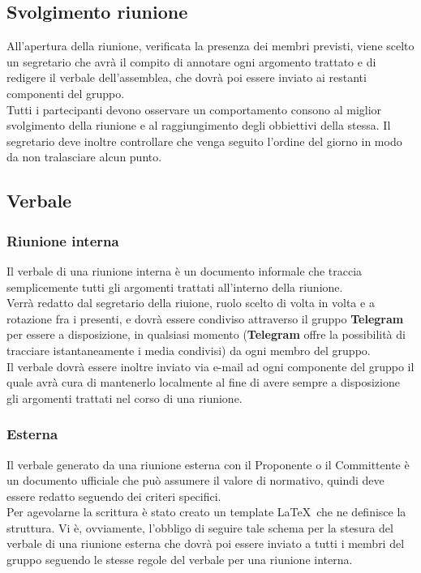     \subsection{Svolgimento riunione}
      All’apertura della riunione, verificata la presenza dei membri previsti, viene scelto un segretario che avrà il compito di annotare ogni argomento trattato e di redigere il verbale
      dell’assemblea, che dovrà poi essere inviato ai restanti componenti del gruppo.\\
      Tutti i partecipanti devono osservare un comportamento consono al miglior svolgimento della riunione e al raggiungimento degli obbiettivi della stessa. Il segretario deve inoltre
      controllare che venga seguito l’ordine del giorno in modo da non tralasciare alcun punto.
    \subsection{Verbale}
      \subsubsection{Riunione interna}
        Il verbale di una riunione interna è un documento informale che traccia semplicemente tutti gli argomenti trattati all'interno della riunione.\\
        Verrà redatto dal segretario della riuione, ruolo scelto di volta in volta e a rotazione fra i presenti, e dovrà essere condiviso attraverso il gruppo \textbf{Telegram}
        per essere a disposizione, in qualsiasi momento (\textbf{Telegram} offre la possibilità di tracciare istantaneamente i media condivisi) da ogni membro del gruppo.\\
        Il verbale dovrà essere inoltre inviato via e-mail ad ogni componente del gruppo il quale avrà cura di mantenerlo localmente al fine di avere sempre a disposizione
        gli argomenti trattati nel corso di una riunione.
      \subsubsection{Esterna}
        Il verbale generato da una riunione esterna con il Proponente o il Committente è un documento ufficiale che può assumere il valore di normativo, quindi deve essere redatto
        seguendo dei criteri specifici.\\
        Per agevolarne la scrittura è stato creato un template \LaTeX\ che ne definisce la struttura.
        Vi è, ovviamente, l'obbligo di seguire tale schema per la stesura del verbale di una riunione esterna che dovrà poi essere inviato a tutti i membri del gruppo seguendo
        le stesse regole del verbale per una riunione interna.
